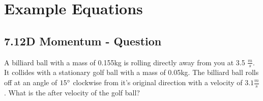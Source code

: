 \documentclass{article}
\begin{document}
\section{Example Equations}
\begin{adjustwidth}{1cm}{0pt}
    \subsection*{7.1\hspace*{0.5cm}2D Momentum - Question}
    \begin{flushleft}
        A billiard ball with a mass of 0.155kg is rolling directly
        away from you at 3.5 $\frac{m}{s}$. It collides with a stationary golf ball with
        a mass of 0.05kg. The billiard ball rolls off at an angle of $15\degree$ clockwise
        from it's original direction with a velocity of $3.1\frac{m}{s}$. What is the after
        velocity of the golf ball?
    \end{flushleft}

\end{adjustwidth}
\end{document}
